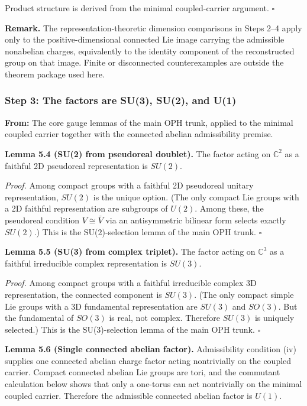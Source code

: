 Product structure is derived from the minimal coupled-carrier argument. \(\square\)

\textbf{Remark.} The representation-theoretic dimension comparisons in Steps 2--4 apply only to the positive-dimensional connected Lie image carrying the admissible nonabelian charges, equivalently to the identity component of the reconstructed group on that image. Finite or disconnected counterexamples are outside the theorem package used here.

\subsubsection{Step 3: The factors are SU(3), SU(2), and U(1)}\label{step-3-the-factors-are-su3-su2-and-u1}

\textbf{From:} The core gauge lemmas of the main OPH trunk, applied to the minimal coupled carrier together with the connected abelian admissibility premise.

\textbf{Lemma 5.4 (SU(2) from pseudoreal doublet).} The factor acting on \(\mathbb{C}^2\) as a faithful 2D pseudoreal representation is \(SU(2)\).

\emph{Proof.} Among compact groups with a faithful 2D pseudoreal unitary representation, \(SU(2)\) is the unique option. (The only compact Lie groups with a 2D faithful representation are subgroups of \(U(2)\). Among these, the pseudoreal condition \(V \cong \bar{V}\) via an antisymmetric bilinear form selects exactly \(SU(2)\).) This is the SU(2)-selection lemma of the main OPH trunk. \(\square\)

\textbf{Lemma 5.5 (SU(3) from complex triplet).} The factor acting on \(\mathbb{C}^3\) as a faithful irreducible complex representation is \(SU(3)\).

\emph{Proof.} Among compact groups with a faithful irreducible complex 3D representation, the connected component is \(SU(3)\). (The only compact simple Lie groups with a 3D fundamental representation are \(SU(3)\) and \(SO(3)\). But the fundamental of \(SO(3)\) is real, not complex. Therefore \(SU(3)\) is uniquely selected.) This is the SU(3)-selection lemma of the main OPH trunk. \(\square\)

\textbf{Lemma 5.6 (Single connected abelian factor).} Admissibility condition (iv) supplies one connected abelian charge factor acting nontrivially on the coupled carrier. Compact connected abelian Lie groups are tori, and the commutant calculation below shows that only a one-torus can act nontrivially on the minimal coupled carrier. Therefore the admissible connected abelian factor is \(U(1)\).

